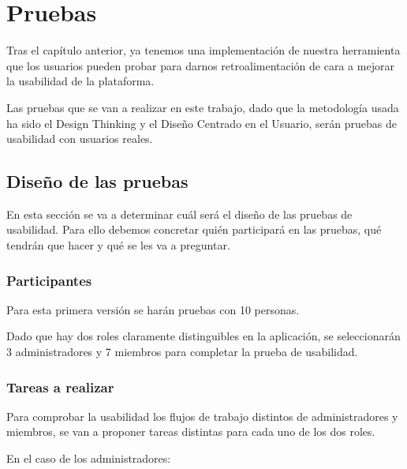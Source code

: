 \chapter{Pruebas}









Tras el capítulo anterior, ya tenemos una implementación de nuestra herramienta que los usuarios pueden probar para darnos retroalimentación de cara a mejorar la usabilidad de la plataforma.

Las pruebas que se van a realizar en este trabajo, dado que la metodología usada ha sido el Design Thinking y el Diseño Centrado en el Usuario, serán pruebas de usabilidad con usuarios reales.

\section{Diseño de las pruebas}

En esta sección se va a determinar cuál será el diseño de las pruebas de usabilidad. Para ello debemos concretar quién participará en las pruebas, qué tendrán que hacer y qué se les va a preguntar.

\subsection{Participantes}

Para esta primera versión se harán pruebas con 10 personas.

Dado que hay dos roles claramente distinguibles en la aplicación, se seleccionarán 3 administradores y 7 miembros para completar la prueba de usabilidad.


\subsection{Tareas a realizar}

Para comprobar la usabilidad los flujos de trabajo distintos de administradores y miembros, se van a proponer tareas distintas para cada uno de los dos roles.

En el caso de los administradores:

